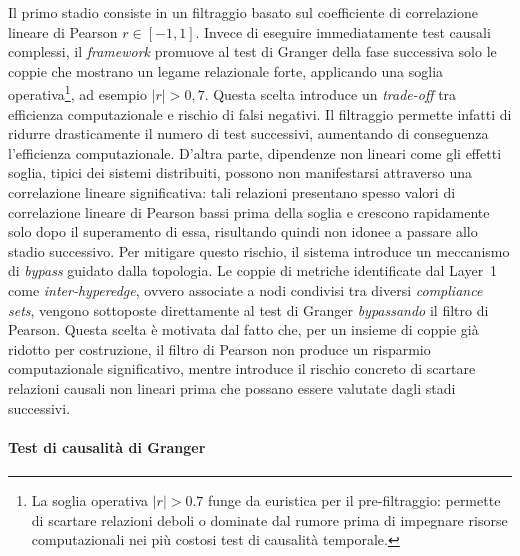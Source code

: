 Il primo stadio consiste in un filtraggio basato sul coefficiente di correlazione lineare di
Pearson $r \in [-1, 1]$. Invece di eseguire immediatamente test causali complessi, il \textit{framework}
promuove al test di Granger della fase successiva solo le coppie che mostrano un legame
relazionale forte, applicando una soglia operativa\footnote{La soglia operativa $|r| > 0.7$ 
funge da euristica per il pre-filtraggio: permette di scartare relazioni deboli o dominate dal 
rumore prima di impegnare risorse computazionali nei più costosi test di causalità temporale.}, 
ad esempio $|r| > 0{,}7$. Questa scelta
introduce un \textit{trade-off} tra efficienza computazionale e rischio di falsi negativi. Il
filtraggio permette infatti di ridurre drasticamente il numero di test successivi, aumentando di
conseguenza l'efficienza computazionale. D'altra parte, dipendenze non lineari come gli effetti
soglia, tipici dei sistemi distribuiti, possono non manifestarsi attraverso una correlazione lineare
significativa: tali relazioni presentano spesso valori di correlazione lineare di Pearson bassi
prima della soglia e crescono rapidamente solo dopo il superamento di essa, risultando quindi non
idonee a passare allo stadio successivo. Per mitigare questo rischio, il sistema introduce un
meccanismo di \textit{bypass} guidato dalla topologia. Le coppie di metriche identificate dal
Layer~1 come \textit{inter-hyperedge}, ovvero associate a nodi condivisi tra diversi \textit{compliance
sets}, vengono sottoposte direttamente al test di Granger \textit{bypassando} il filtro di Pearson.
Questa scelta è motivata dal fatto che, per un insieme di coppie già ridotto per costruzione, il
filtro di Pearson non produce un risparmio computazionale significativo, mentre introduce il rischio
concreto di scartare relazioni causali non lineari prima che possano essere valutate dagli stadi
successivi.

\paragraph{Test di causalità di Granger}

